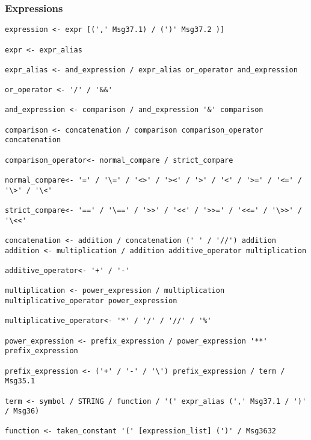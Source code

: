 \subsubsection{Expressions}

\begin{verbatim}
expression <- expr [(',' Msg37.1) / (')' Msg37.2 )]

expr <- expr_alias

expr_alias <- and_expression / expr_alias or_operator and_expression

or_operator <- '/' / '&&'

and_expression <- comparison / and_expression '&' comparison

comparison <- concatenation / comparison comparison_operator concatenation

comparison_operator<- normal_compare / strict_compare

normal_compare<- '=' / '\=' / '<>' / '><' / '>' / '<' / '>=' / '<=' / '\>' / '\<'

strict_compare<- '==' / '\==' / '>>' / '<<' / '>>=' / '<<=' / '\>>' / '\<<'

concatenation <- addition / concatenation (' ' / '//') addition
addition <- multiplication / addition additive_operator multiplication

additive_operator<- '+' / '-'

multiplication <- power_expression / multiplication multiplicative_operator power_expression

multiplicative_operator<- '*' / '/' / '//' / '%'

power_expression <- prefix_expression / power_expression '**' prefix_expression

prefix_expression <- ('+' / '-' / '\') prefix_expression / term / Msg35.1

term <- symbol / STRING / function / '(' expr_alias (',' Msg37.1 / ')' / Msg36)

function <- taken_constant '(' [expression_list] (')' / Msg3632
\end{verbatim}
